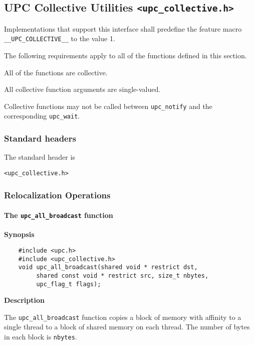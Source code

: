 \subsection{UPC Collective Utilities {\tt <upc\_collective.h>}}
\label{upc-collective}

\npf Implementations that support this interface shall predefine the
    feature macro {\tt \_\_UPC\_COLLECTIVE\_\_} to the value 1.

\np The following requirements apply to all of the functions defined
in this section.

\np All of the functions are collective.

\np All collective function arguments are single-valued.

\np Collective functions may not be called between {\tt upc\_notify}
and the corresponding {\tt upc\_wait}.

\subsubsection{Standard headers}

\np The standard header is

{\tt <upc\_collective.h>}

\subsubsection{Relocalization Operations}

\paragraph{The {\tt upc\_all\_broadcast} function}

{\bf Synopsis} 

\npf\vspace{-2.5em}
\begin{verbatim}
    #include <upc.h>
    #include <upc_collective.h>
    void upc_all_broadcast(shared void * restrict dst, 
         shared const void * restrict src, size_t nbytes, 
         upc_flag_t flags);
\end{verbatim}

{\bf Description} 

\np The {\tt upc\_all\_broadcast} function copies a block of memory with
affinity to a single thread to a block of shared memory on each thread.
The number of bytes in each block is {\tt nbytes}.

